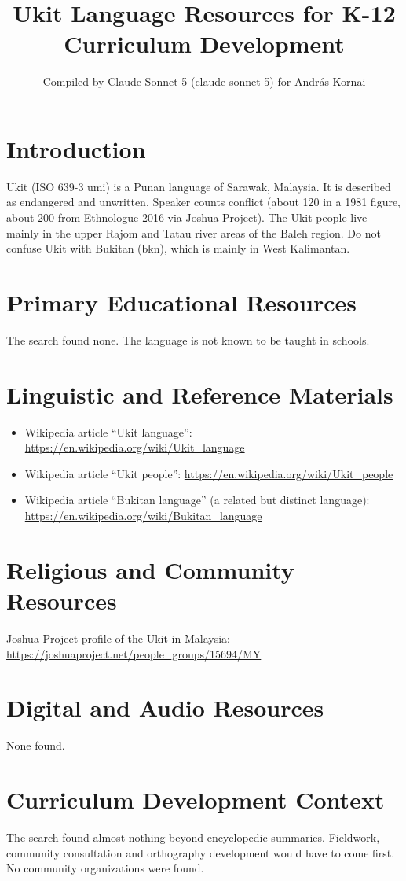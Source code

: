 \documentclass[12pt]{article}
\title{Ukit Language Resources for K-12 Curriculum Development}
\author{Compiled by Claude Sonnet 5 (claude-sonnet-5) for Andr\'as Kornai}
\date{}
\begin{document}
\maketitle

\section{Introduction}
Ukit (ISO 639-3 umi) is a Punan language of Sarawak, Malaysia. It is described as endangered and unwritten. Speaker counts conflict (about 120 in a 1981 figure, about 200 from Ethnologue 2016 via Joshua Project). The Ukit people live mainly in the upper Rajom and Tatau river areas of the Baleh region. Do not confuse Ukit with Bukitan (bkn), which is mainly in West Kalimantan.

\section{Primary Educational Resources}
The search found none. The language is not known to be taught in schools.

\section{Linguistic and Reference Materials}
\begin{itemize}
\item Wikipedia article ``Ukit language'': \url{https://en.wikipedia.org/wiki/Ukit_language}
\item Wikipedia article ``Ukit people'': \url{https://en.wikipedia.org/wiki/Ukit_people}
\item Wikipedia article ``Bukitan language'' (a related but distinct language): \url{https://en.wikipedia.org/wiki/Bukitan_language}
\end{itemize}

\section{Religious and Community Resources}
Joshua Project profile of the Ukit in Malaysia: \url{https://joshuaproject.net/people_groups/15694/MY}

\section{Digital and Audio Resources}
None found.

\section{Curriculum Development Context}
The search found almost nothing beyond encyclopedic summaries. Fieldwork, community consultation and orthography development would have to come first. No community organizations were found.
\end{document}
